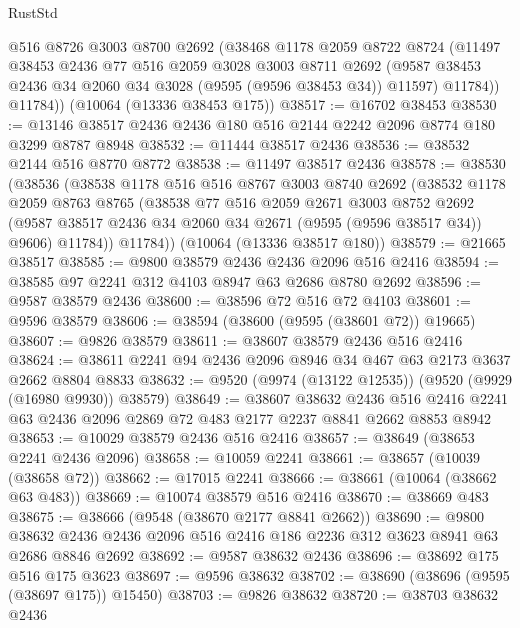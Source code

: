 \begin{lexlean}{RustStd}
\begin{coremodule}
        @516
        @8726
        @3003
        @8700
        @2692
        (@38468
          @1178
          @2059
          @8722
          @8724
          (@11497
            @38453
            @2436
            @77
            @516
            @2059
            @3028
            @3003
            @8711
            @2692
            (@9587 @38453 @2436 @34 @2060 @34 @3028 (@9595 (@9596 @38453 @34)) @11597)
            @11784))
        @11784))
    (@10064 (@13336 @38453 @175))
@38517 := @16702 @38453
@38530 := @13146 @38517 @2436 @2436 @180 @516 @2144 @2242 @2096 @8774 @180 @3299 @8787 @8948
@38532 := @11444 @38517 @2436
@38536 := @38532 @2144 @516 @8770 @8772
@38538 := @11497 @38517 @2436
@38578 := @38530
    (@38536
      (@38538
        @1178
        @516
        @516
        @8767
        @3003
        @8740
        @2692
        (@38532
          @1178
          @2059
          @8763
          @8765
          (@38538
            @77
            @516
            @2059
            @2671
            @3003
            @8752
            @2692
            (@9587 @38517 @2436 @34 @2060 @34 @2671 (@9595 (@9596 @38517 @34)) @9606)
            @11784))
        @11784))
    (@10064 (@13336 @38517 @180))
@38579 := @21665 @38517
@38585 := @9800 @38579 @2436 @2436 @2096 @516 @2416
@38594 := @38585 @97 @2241 @312 @4103 @8947 @63 @2686 @8780 @2692
@38596 := @9587 @38579 @2436
@38600 := @38596 @72 @516 @72 @4103
@38601 := @9596 @38579
@38606 := @38594 (@38600 (@9595 (@38601 @72)) @19665)
@38607 := @9826 @38579
@38611 := @38607 @38579 @2436 @516 @2416
@38624 := @38611 @2241 @94 @2436 @2096 @8946 @34 @467 @63 @2173 @3637 @2662 @8804 @8833
@38632 := @9520 (@9974 (@13122 @12535)) (@9520 (@9929 (@16980 @9930)) @38579)
@38649 := @38607
    @38632
    @2436
    @516
    @2416
    @2241
    @63
    @2436
    @2096
    @2869
    @72
    @483
    @2177
    @2237
    @8841
    @2662
    @8853
    @8942
@38653 := @10029 @38579 @2436 @516 @2416
@38657 := @38649 (@38653 @2241 @2436 @2096)
@38658 := @10059 @2241
@38661 := @38657 (@10039 (@38658 @72))
@38662 := @17015 @2241
@38666 := @38661 (@10064 (@38662 @63 @483))
@38669 := @10074 @38579 @516 @2416
@38670 := @38669 @483
@38675 := @38666 (@9548 (@38670 @2177 @8841 @2662))
@38690 := @9800
    @38632
    @2436
    @2436
    @2096
    @516
    @2416
    @186
    @2236
    @312
    @3623
    @8941
    @63
    @2686
    @8846
    @2692
@38692 := @9587 @38632 @2436
@38696 := @38692 @175 @516 @175 @3623
@38697 := @9596 @38632
@38702 := @38690 (@38696 (@9595 (@38697 @175)) @15450)
@38703 := @9826 @38632
@38720 := @38703
    @38632
    @2436

\end{coremodule}
\end{lexlean}
